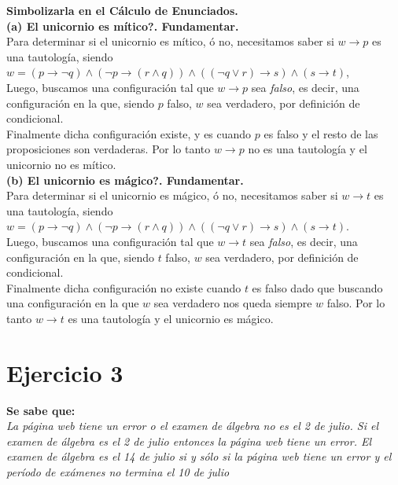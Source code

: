 \documentclass[lnbip]{svmultln}
\begin{document}
\textbf{Simbolizarla en el Cálculo de Enunciados.} \\

\textbf{(a) El unicornio es mítico?. Fundamentar.} \\

Para determinar si el unicornio es mítico, ó no, necesitamos saber si $w \rightarrow p$ es una tautología, siendo  $w = (p \rightarrow \neg q) \wedge (\neg p \rightarrow (r \wedge q)) \wedge ((\neg q \vee r) \rightarrow s) \wedge (s \rightarrow t)$, \\

Luego, buscamos una configuración tal que $w \rightarrow p$ sea \textit{falso}, es decir, una configuración en la que, siendo $p$ falso, $w$ sea verdadero, por definición de condicional. \\

Finalmente dicha configuración existe, y es cuando $p$ es falso y el resto de las proposiciones son verdaderas. Por lo tanto $w \rightarrow p$ no es una tautología y el unicornio no es mítico. \\

\textbf{(b) El unicornio es mágico?. Fundamentar.} \\

Para determinar si el unicornio es mágico, ó no, necesitamos saber si $w \rightarrow t$ es una tautología, siendo  $w = (p \rightarrow \neg q) \wedge (\neg p \rightarrow (r \wedge q)) \wedge ((\neg q \vee r) \rightarrow s) \wedge (s \rightarrow t)$. \\

Luego, buscamos una configuración tal que $w \rightarrow t$ sea \textit{falso}, es decir, una configuración en la que, siendo $t$ falso, $w$ sea verdadero, por definición de condicional. \\

Finalmente dicha configuración no existe cuando $t$ es falso dado que buscando una configuración en la que $w$ sea verdadero nos queda siempre $w$ falso. Por lo tanto $w \rightarrow t$ es una tautología y el unicornio es mágico.

\section{Ejercicio 3}

\textbf{Se sabe que:} \\

\textit{La página web tiene un error o el examen de álgebra no es el 2 de julio.
Si el examen de álgebra es el 2 de julio entonces la página web tiene un error.
El examen de álgebra es el 14 de julio si y sólo si la página web tiene un error
y el período de exámenes no termina el 10 de julio} \\
\end{document}
